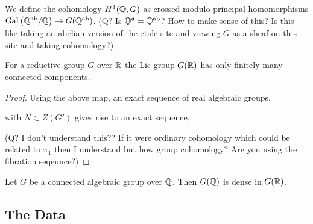\documentclass[12pt]{article}
\begin{document}
\begin{defn}
We define the cohomology $H^1(\mathbb{Q}, G)$ as crossed modulo principal homomorphisms $\mathrm{Gal}\left( \mathbb{Q}^{\mathrm{ab}} / \mathbb{Q} \right) \to G(\mathbb{Q}^{\mathrm{ab}})$. 
(Q? Is $\mathbb{Q}^{\mathfrak{a}} = \mathbb{Q}^{\mathrm{ab}}$? How to make sense of this? Is this like taking an abelian version of the etale site and viewing $G$ as a sheaf on this site and taking cohomology?)
\end{defn}

\begin{prop}
For a reductive group $G$ over $\mathbb{R}$ the Lie group $G(\mathbb{R})$ has only finitely many connected components. 
\end{prop}

\begin{proof}
Using the above map, an exact sequence of real algebraic groups,
\begin{center}
\end{center}
with $N \subset Z(G')$ gives rise to an exact sequence, 
\begin{center}
\end{center}
(Q? I don't understand this?? If it were ordinary cohomology which could be related to $\pi_1$ then I understand but how group cohomology? Are you using the fibration seqeunce?)
\end{proof}

\begin{theorem}
Let $G$ be a connected algebraic group over $\mathbb{Q}$. Then $G(\mathbb{Q})$ is dense in $G(\mathbb{R})$.
\end{theorem}

\subsection{The Data}
\end{document}
